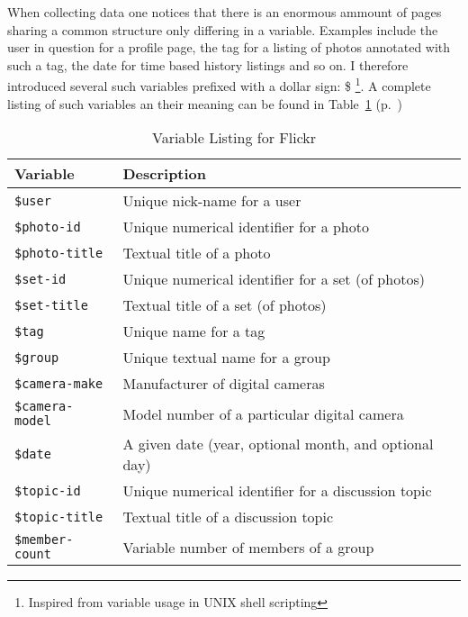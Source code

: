 \documentclass[12pt,a4paper]{article}
\newcommand{\var}[1]{\texttt{\${#1}}}
\begin{document}
When collecting data one notices that there is an enormous ammount of pages
sharing a common structure only differing in a variable. Examples include
the user in question for a profile page, the tag for a listing of photos
annotated with such a tag, the date for time based history listings and so on.
I therefore introduced several such variables prefixed with a dollar sign: \$
\footnote{Inspired from variable usage in UNIX shell scripting}. A complete
listing of such variables an their meaning can be found in
Table~\ref{table:flickr.variable.list}
(p.~\pageref{table:flickr.variable.list})

\begin{table}[h!b!p!]
  \caption{Variable Listing for Flickr}
  \label{table:flickr.variable.list}
  \begin{center}
    \begin{tabular}{l|l}

      Variable &
      Description \\

      \hline

      \var{user} &
      Unique nick-name for a user \\

      \var{photo-id} &
      Unique numerical identifier for a photo \\

      \var{photo-title} &
      Textual title of a photo \\

      \var{set-id} &
      Unique numerical identifier for a set (of photos) \\

      \var{set-title} &
      Textual title of a set (of photos) \\

      \var{tag} &
      Unique name for a tag \\

      \var{group} &
      Unique textual name for a group \\

      \var{camera-make} &
      Manufacturer of digital cameras \\

      \var{camera-model} &
      Model number of a particular digital camera \\

      \var{date} &
      A given date (year, optional month, and optional day) \\

      \var{topic-id} &
      Unique numerical identifier for a discussion topic \\

      \var{topic-title} &
      Textual title of a discussion topic \\

      \var{member-count} &
      Variable number of members of a group \\

    \end{tabular}
  \end{center}
\end{table}
\end{document}
